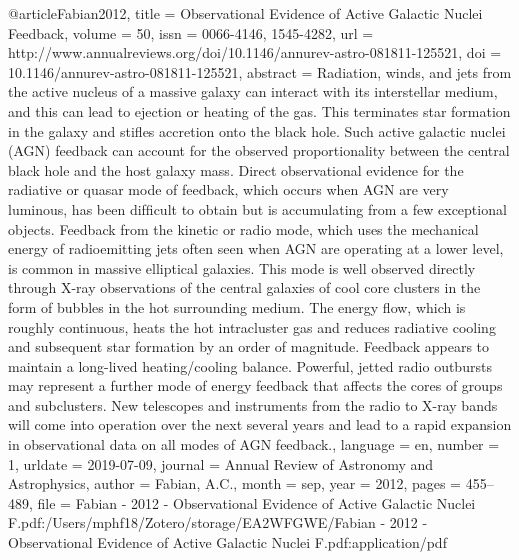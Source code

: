 {@article{Fabian2012,
	title = {Observational {Evidence} of {Active} {Galactic} {Nuclei} {Feedback}},
	volume = {50},
	issn = {0066-4146, 1545-4282},
	url = {http://www.annualreviews.org/doi/10.1146/annurev-astro-081811-125521},
	doi = {10.1146/annurev-astro-081811-125521},
	abstract = {Radiation, winds, and jets from the active nucleus of a massive galaxy can interact with its interstellar medium, and this can lead to ejection or heating of the gas. This terminates star formation in the galaxy and stiﬂes accretion onto the black hole. Such active galactic nuclei (AGN) feedback can account for the observed proportionality between the central black hole and the host galaxy mass. Direct observational evidence for the radiative or quasar mode of feedback, which occurs when AGN are very luminous, has been difﬁcult to obtain but is accumulating from a few exceptional objects. Feedback from the kinetic or radio mode, which uses the mechanical energy of radioemitting jets often seen when AGN are operating at a lower level, is common in massive elliptical galaxies. This mode is well observed directly through X-ray observations of the central galaxies of cool core clusters in the form of bubbles in the hot surrounding medium. The energy ﬂow, which is roughly continuous, heats the hot intracluster gas and reduces radiative cooling and subsequent star formation by an order of magnitude. Feedback appears to maintain a long-lived heating/cooling balance. Powerful, jetted radio outbursts may represent a further mode of energy feedback that affects the cores of groups and subclusters. New telescopes and instruments from the radio to X-ray bands will come into operation over the next several years and lead to a rapid expansion in observational data on all modes of AGN feedback.},
	language = {en},
	number = {1},
	urldate = {2019-07-09},
	journal = {Annual Review of Astronomy and Astrophysics},
	author = {Fabian, A.C.},
	month = sep,
	year = {2012},
	pages = {455--489},
	file = {Fabian - 2012 - Observational Evidence of Active Galactic Nuclei F.pdf:/Users/mphf18/Zotero/storage/EA2WFGWE/Fabian - 2012 - Observational Evidence of Active Galactic Nuclei F.pdf:application/pdf}
}


}
